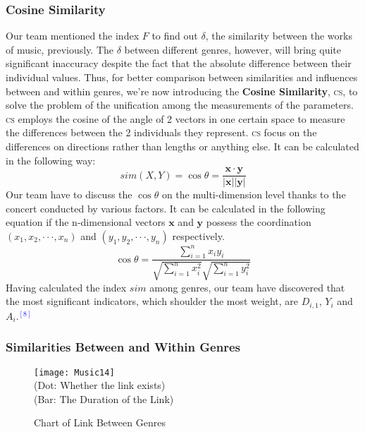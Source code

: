\documentclass[12pt]{article}
\begin{document}
{{\subsubsection{Cosine Similarity}
Our team mentioned the index $F$ to find out $\delta$, the similarity between the works of music, previously. The $\delta$ between different genres, however, will bring quite significant inaccuracy despite the fact that the absolute difference between their individual values. Thus, for better comparison between similarities and influences between and within genres, we're now introducing the {\textbf{Cosine Similarity}}, {\textsc{cs}}, to solve the problem of the unification among the measurements of the parameters.\\[2ex]
{\textsc{cs}} employs the cosine of the angle of 2 vectors in one certain space to measure the differences between the 2 individuals they represent. {\textsc{cs}} focus on the differences on directions rather than lengths or anything else. It can be calculated in the following way:
\begin{equation}
	sim(X,Y)=\cos\theta=\frac{\boldsymbol{x}\cdot\boldsymbol{y}}{|\boldsymbol{x}||\boldsymbol{y}|}
\end{equation}
Our team have to discuss the $\cos\theta$ on the multi-dimension level thanks to the concert conducted by various factors. It can be calculated in the following equation if the n-dimensional vectors $\boldsymbol{x}$ and $\boldsymbol{y}$ possess the coordination $(x_1, x_2,\cdot\cdot\cdot ,x_n )$ and $(y_1, y_2,\cdot\cdot\cdot ,y_n )$ respectively.
\begin{equation}
	\cos\theta=\frac{\sum\limits_{i=1}^nx_iy_i}{\sqrt{\sum\limits_{i=1}^nx_i^2}\sqrt{\sum\limits_{i=1}^ny_i^2}}
\end{equation}
Having calculated the index $sim$ among genres, our team have discovered that the most significant indicators, which shoulder the most weight, are $D_{i,1}$, $Y_i$ and $A_i$.\textcolor{blue}{$^{[8]}$}
\subsubsection{Similarities Between and Within Genres}
\begin{wrapfigure}{l}{10cm}
\centering
\texttt{[image: Music14]}\\
(Dot: Whether the link exists)\\
(Bar: The Duration of the Link)
\caption{Chart of Link Between Genres}
\end{wrapfigure}

}}
\end{document}
